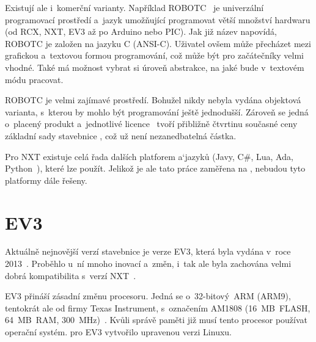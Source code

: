 Existují ale i~komerční varianty. 
Například ROBOTC~\cite{legoProgramingPlatform_ROBOTC} je univerzální programovací prostředí a~jazyk umožňující programovat větší množství hardwaru (od \legoM{ }RCX, NXT, EV3 až po Arduino nebo PIC). 
Jak již název napovídá, ROBOTC je založen na jazyku C (ANSI-C).
Uživatel ovšem může přecházet mezi grafickou a~textovou formou programování, což může být pro začátečníky velmi vhodné.
Také má možnost vybrat si úroveň abstrakce, na jaké bude v~textovém módu pracovat.  

ROBOTC je velmi zajímavé prostředí. Bohužel nikdy nebyla vydána objektová varianta, s~kterou by mohlo být programování ještě jednodušší. 
Zároveň se jedná o~placený produkt a~jednotlivé licence~\cite{legoProgramingPlatform_ROBOTC-price} tvoří přibližně čtvrtinu současné ceny základní sady stavebnice \legoEV{~}\cite{lego_eduxeEshop_CoreSet}, což už není nezanedbatelná částka.

Pro NXT existuje celá řada dalších platforem a`jazyků (Javy, C\#, Lua, Ada, Python~\cite{legoMindstormsNXT_Programming}), které lze použít. 
Jelikož je ale tato práce zaměřena na \legoEV{ }, nebudou tyto platformy dále řešeny. 

\section{\legoM{ }EV3}

Aktuálně nejnovější verzí stavebnice \legoM{ }je verze EV3, která byla vydána v~roce 2013~\cite{lego_mindstormsHistory}. 
Proběhlo u~ní mnoho inovací a~změn, i~tak ale byla zachována velmi dobrá kompatibilita s~verzí NXT~\cite{legoRobotSquare_EV3-and-NXT-compatibility}.

EV3 přináší zásadní změnu procesoru. 
Jedná se o~32-bitový~ARM (ARM9), tentokrát ale od firmy Texas Instrument, s~označením AM1808 (16~MB~FLASH, 64~MB~RAM, 300~MHz)~\cite{legoMindstormsEV3_fw-dev-kit}. 
Kvůli správě paměti již musí tento procesor používat operační systém. %
\lego{ }pro EV3 vytvořilo upravenou verzi Linuxu. 

